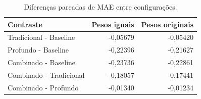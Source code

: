 \begin{table}[htbp]
\centering\small
\caption{Diferenças pareadas de MAE entre configurações.}
\label{tab:contrastes}
\begin{tabular}{lrr}
\toprule
Contraste & Pesos iguais & Pesos originais \\
\midrule
Tradicional - Baseline & -0,05679 & -0,05420 \\
Profundo - Baseline & -0,22396 & -0,21627 \\
Combinado - Baseline & -0,23736 & -0,22861 \\
Combinado - Tradicional & -0,18057 & -0,17441 \\
Combinado - Profundo & -0,01340 & -0,01234 \\
\bottomrule
\end{tabular}
\end{table}
